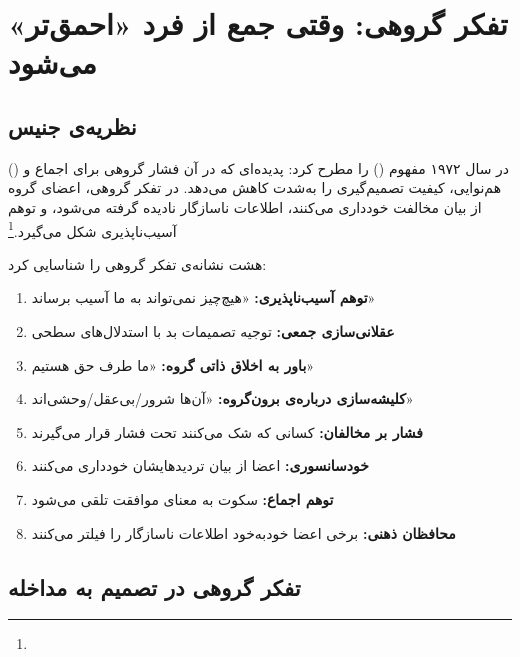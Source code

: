 \section{تفکر گروهی: وقتی جمع از فرد «احمق‌تر» می‌شود}
\label{sec:ch11-groupthink}

\subsection{نظریه‌ی جنیس}
\label{subsec:ch11-janis}

 () در سال ۱۹۷۲ مفهوم  () را مطرح کرد: پدیده‌ای که در آن فشار گروهی برای اجماع و هم‌نوایی، کیفیت تصمیم‌گیری را به‌شدت کاهش می‌دهد. در تفکر گروهی، اعضای گروه از بیان مخالفت خودداری می‌کنند، اطلاعات ناسازگار نادیده گرفته می‌شود، و توهم آسیب‌ناپذیری شکل می‌گیرد.\footnote{}

\begin{tcolorbox}[defbox, title={تعریف: تفکر گروهی — هشت نشانه}]
 هشت نشانه‌ی تفکر گروهی را شناسایی کرد:
\begin{enumerate}
\item \textbf{توهم آسیب‌ناپذیری:} «هیچ‌چیز نمی‌تواند به ما آسیب برساند»
\item \textbf{عقلانی‌سازی جمعی:} توجیه تصمیمات بد با استدلال‌های سطحی
\item \textbf{باور به اخلاق ذاتی گروه:} «ما طرف حق هستیم»
\item \textbf{کلیشه‌سازی درباره‌ی برون‌گروه:} «آن‌ها شرور/بی‌عقل/وحشی‌اند»
\item \textbf{فشار بر مخالفان:} کسانی که شک می‌کنند تحت فشار قرار می‌گیرند
\item \textbf{خودسانسوری:} اعضا از بیان تردیدهایشان خودداری می‌کنند
\item \textbf{توهم اجماع:} سکوت به معنای موافقت تلقی می‌شود
\item \textbf{محافظان ذهنی:} برخی اعضا خودبه‌خود اطلاعات ناسازگار را فیلتر می‌کنند
\end{enumerate}
\end{tcolorbox}

\subsection{تفکر گروهی در تصمیم به مداخله}
\label{subsec:ch11-groupthink-intervention}

